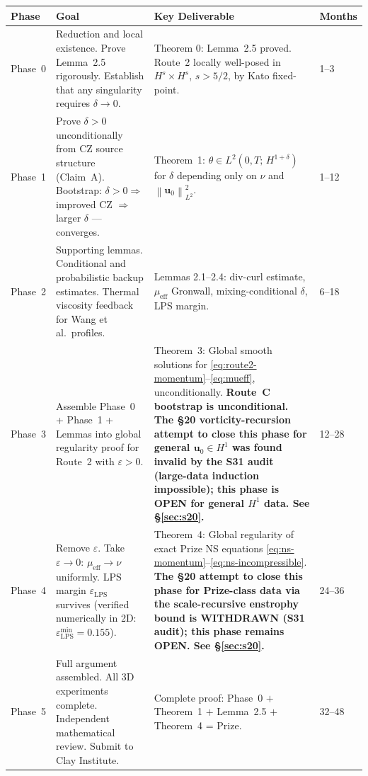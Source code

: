 \documentclass[11pt, a4paper]{article}
\theoremstyle{definition}
\theoremstyle{remark}
\newcommand{\eps}{\varepsilon}
\newcommand{\norm}[1]{\left\|#1\right\|}
\newcommand{\thet}{\theta}
\newcommand{\mueff}{\mu_{\mathrm{eff}}}
\newcommand{\epslps}{\eps_{\mathrm{LPS}}}
\newcommand{\delt}{\delta}
\newcommand{\LtHs}[1]{L^2(0,T;\,H^{#1})}
\begin{document}
\begin{center}
\begin{longtable}{p{2.2cm}p{5.0cm}p{4.5cm}p{2.0cm}}
\toprule
\textbf{Phase} & \textbf{Goal} & \textbf{Key Deliverable} & \textbf{Months} \\
\midrule
\endhead
\bottomrule
\endfoot

Phase~0 &
Reduction and local existence.
Prove Lemma~2.5 rigorously. Establish that any singularity requires $\delt\to 0$. &
Theorem 0: Lemma~2.5 proved. Route~2 locally well-posed in $H^s\times H^s$, $s > 5/2$, by Kato fixed-point. &
1--3 \\[6pt]

Phase~1 &
Prove $\delt > 0$ unconditionally from CZ source structure (Claim~A).
Bootstrap: $\delt > 0 \Rightarrow$ improved CZ $\Rightarrow$ larger $\delt$ --- converges. &
Theorem~1: $\thet \in \LtHs{1+\delt}$ for $\delt$ depending only on $\nu$ and $\norm{\mathbf{u}_0}_{L^2}^2$. &
1--12 \\[6pt]

Phase~2 &
Supporting lemmas. Conditional and probabilistic backup estimates.
Thermal viscosity feedback for Wang et al.\ profiles. &
Lemmas 2.1--2.4: div-curl estimate, $\mueff$ Gronwall, mixing-conditional $\delt$, LPS margin. &
6--18 \\[6pt]

Phase~3 &
Assemble Phase~0 + Phase~1 + Lemmas into global regularity proof for Route~2 with $\eps > 0$. &
Theorem~3: Global smooth solutions for \eqref{eq:route2-momentum}--\eqref{eq:mueff}, unconditionally.
\textbf{Route~C bootstrap is unconditional. The \S20 vorticity-recursion attempt to
close this phase for general $\mathbf{u}_0\in H^1$ was found invalid by the S31
audit (large-data induction impossible); this phase is OPEN for general $H^1$
data. See \S\ref{sec:s20}.} &
12--28 \\[6pt]

Phase~4 &
Remove $\eps$. Take $\eps\to 0$: $\mueff\to\nu$ uniformly.
LPS margin $\epslps$ survives (verified numerically in 2D: $\epslps^{\min} = 0.155$). &
Theorem~4: Global regularity of exact Prize NS equations \eqref{eq:ns-momentum}--\eqref{eq:ns-incompressible}.
\textbf{The \S20 attempt to close this phase for Prize-class data via the
scale-recursive enstrophy bound is WITHDRAWN (S31 audit); this phase remains
OPEN. See \S\ref{sec:s20}.} &
24--36 \\[6pt]

Phase~5 &
Full argument assembled. All 3D experiments complete. Independent mathematical review. Submit to Clay Institute. &
Complete proof: Phase~0 $+$ Theorem~1 $+$ Lemma~2.5 $+$ Theorem~4 = Prize. &
32--48 \\

\end{longtable}
\end{center}
\end{document}
